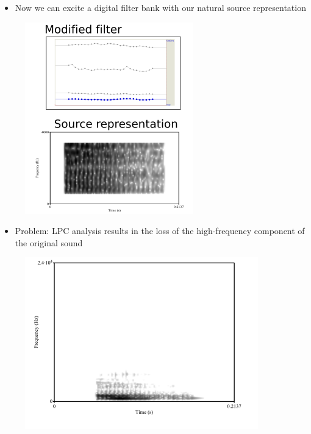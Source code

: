 \documentclass{beamer}
\begin{document}
\begin{frame}
\begin{itemize}
\item{Now we can excite a digital filter bank with our natural source representation}
\end{itemize}
\begin{figure}
\includegraphics[scale=0.6,keepaspectratio]{LPC_synth.png}
\end{figure}
\end{frame}
\begin{frame}
\begin{itemize}
\item{Problem: LPC analysis results in the loss of the high-frequency component of the original sound}
\end{itemize}
\begin{figure}
\includegraphics[scale=0.5,keepaspectratio]{LPC_lossy.png}
\end{figure}
\end{frame}
\end{document}
